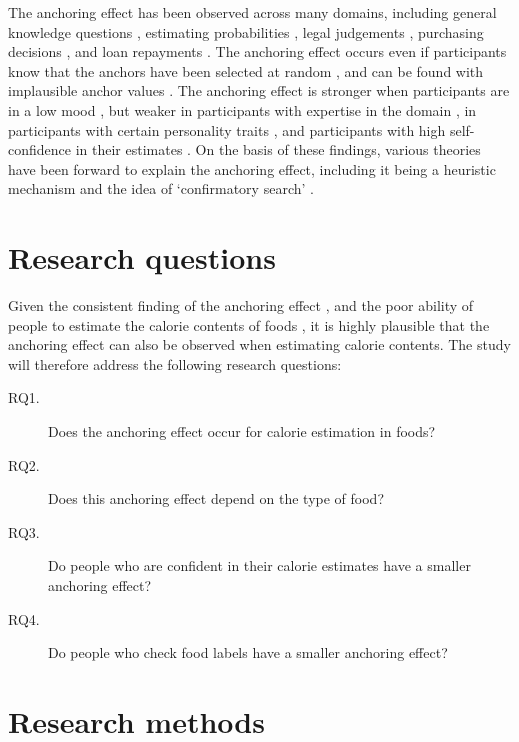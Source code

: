 \documentclass[a4paper,doc,natbib]{apa6}
\begin{document}
The anchoring effect has been observed across many domains, including general knowledge questions \citep[e.g.,][]{blankenship2008elaboration,epley2001putting},  estimating probabilities \citep{plous1989thinking}, legal judgements \citep{enough2001sentencing}, purchasing decisions \citep{ariely2003coherent}, and loan repayments \citep{stewart2009cost}. The anchoring effect occurs even if participants know that the anchors have been selected at random \citep{englich2006playing,tversky1974judgment}, and can be found with implausible anchor values \citep{strack1997explaining}. The anchoring effect is stronger when participants are in a low mood \citep{englich2009moody}, but weaker in participants with expertise in the domain \citep{wilson1996new,englich2009moody}, in participants with certain personality traits \citep{eroglu2010biases}, and participants with high self-confidence in their estimates \citep{wu2012role}. On the basis of these findings, various theories have been forward to explain the anchoring effect, including it being a heuristic mechanism \citep{tversky1974judgment} and the idea of `confirmatory search' \citep{chapman1999anchoring}.

\section{Research questions}

Given the consistent finding of the anchoring effect \citep{furnham2011literature}, and the poor ability of people to estimate the calorie contents of foods \citep[e.g.,][]{ebneter2013less}, it is highly plausible that the anchoring effect can also be observed when estimating calorie contents. The study will therefore address the following research questions:

\begin{description}
\item[RQ1.] Does the anchoring effect occur for calorie estimation in foods?
\item[RQ2.] Does this anchoring effect depend on the type of food?
\item[RQ3.] Do people who are confident in their calorie estimates have a smaller anchoring effect?
\item[RQ4.] Do people who check food labels have a smaller anchoring effect?
\end{description}


\section{Research methods}
\end{document}
